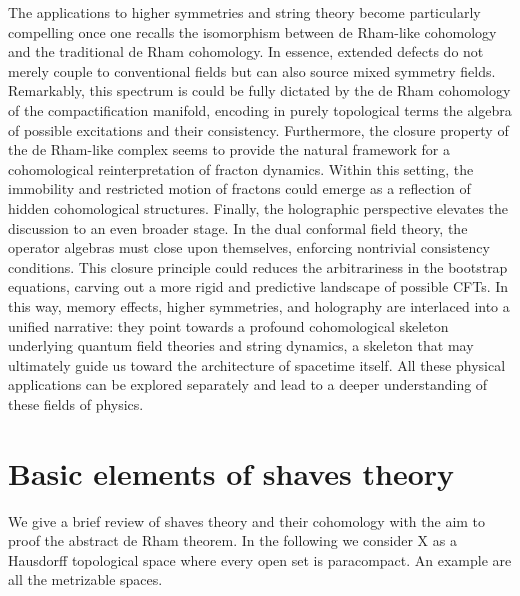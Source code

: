 \documentclass[a4paper,12pt]{article}
\begin{document}
The applications to higher symmetries and string theory become particularly compelling once one recalls the isomorphism between de Rham-like cohomology and the traditional de Rham cohomology. In essence, extended defects do not merely couple to conventional fields but can also source mixed symmetry fields. Remarkably, this spectrum is could be fully dictated by the de Rham cohomology of the compactification manifold, encoding in purely topological terms the algebra of possible excitations and their consistency.
Furthermore, the closure property of the de Rham-like complex seems to provide the natural framework for a cohomological reinterpretation of fracton dynamics. Within this setting, the immobility and restricted motion of fractons could emerge as a reflection of hidden cohomological structures.
Finally, the holographic perspective elevates the discussion to an even broader stage. In the dual conformal field theory, the operator algebras must close upon themselves, enforcing nontrivial consistency conditions. This closure principle could reduces the arbitrariness in the bootstrap equations, carving out a more rigid and predictive landscape of possible CFTs. In this way, memory effects, higher symmetries, and holography are interlaced into a unified narrative: they point towards a profound cohomological skeleton underlying quantum field theories and string dynamics, a skeleton that may ultimately guide us toward the architecture of spacetime itself. All these physical applications can be explored separately and lead to a deeper understanding of these fields of physics.
\appendix 

\section{Basic elements of shaves theory}\label{appfasci}
We give a brief review of shaves theory and their cohomology with the aim to proof the abstract de Rham theorem. In the following we consider X as a Hausdorff topological space where every open set is paracompact. An example are all the metrizable spaces.
\end{document}
